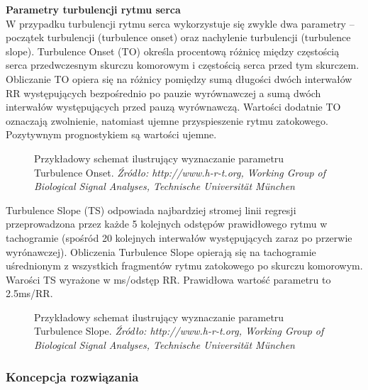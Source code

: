 \documentclass[a4paper, 11pt]{article}
\begin{document}
\textbf{Parametry turbulencji rytmu serca}\\
W przypadku turbulencji rytmu serca wykorzystuje się zwykle dwa parametry
-- początek turbulencji (turbulence onset) oraz nachylenie turbulencji (turbulence slope). Turbulence Onset (TO) określa procentową różnicę między częstością serca przedwczesnym skurczu komorowym i częstością serca przed tym skurczem. Obliczanie TO opiera się na różnicy pomiędzy sumą długości dwóch interwałów RR występujących bezpośrednio po pauzie wyrównawczej a sumą dwóch interwałów występujących przed pauzą wyrównawczą.
Wartości dodatnie TO oznaczają zwolnienie, natomiast ujemne przyspieszenie rytmu zatokowego. Pozytywnym prognostykiem są wartości ujemne.

\begin{figure}[h!]
\centering
\caption{Przykładowy schemat ilustrujący wyznaczanie parametru Turbulence Onset.
\textit{ Źródło: http://www.h-r-t.org, Working Group of Biological Signal Analyses, Technische Universität München} }
\end{figure}
\par Turbulence Slope (TS) odpowiada najbardziej stromej linii regresji przeprowadzona przez każde 5 kolejnych odstępów prawidłowego rytmu w tachogramie (spośród 20 kolejnych interwałów występujących zaraz po przerwie wyrónawczej). Obliczenia Turbulence Slope opierają się na tachogramie uśrednionym z wszystkich fragmentów rytmu zatokowego po skurczu komorowym. Warości TS wyrażone w ms/odstęp RR. Prawidłowa wartość parametru to 2.5ms/RR.
\begin{figure}[h!]
\centering
\caption{Przykładowy schemat ilustrujący wyznaczanie parametru Turbulence Slope.
\textit{ Źródło: http://www.h-r-t.org, Working Group of Biological Signal Analyses, Technische Universität München} }
\end{figure}
\newpage

\subsubsection{Koncepcja rozwiązania}
\label{sec:hrt:procs}
\end{document}
